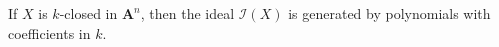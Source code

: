 If $X$ is $k$-closed in $\mathbf{A}^n$, then the ideal $\mathcal{I}(X)$ is generated by polynomials with coefficients in $k$.
